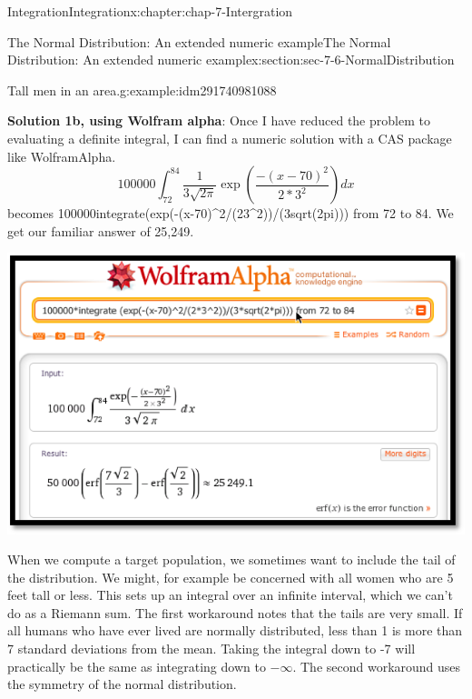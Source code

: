 \documentclass[oneside,10pt,]{book}
\newcommand{\terminology}[1]{\textbf{#1}}
\numberwithin{equation}{section}
\begin{document}
\begin{chapterptx}{Integration}{}{Integration}{}{}{x:chapter:chap-7-Intergration}
\begin{sectionptx}{The Normal Distribution: An extended numeric example}{}{The Normal Distribution: An extended numeric example}{}{}{x:section:sec-7-6-NormalDistribution}
\begin{example}{Tall men in an area.}{g:example:idm291740981088}
\begin{sidebyside}{1}{0.25}{0.25}{0}
\begin{sbspanel}{0.5}
\end{sbspanel}%
\end{sidebyside}%
\par
\terminology{Solution 1b, using Wolfram alpha}:  Once I have reduced the problem to evaluating a definite integral, I can find a numeric solution with a CAS package like Wolfram\textbar{}Alpha.%
%
\begin{equation*}
100000\int_{72}^{84} \frac{1}{3\sqrt{2\pi}} \exp\left(\frac{-(x-70)^2}{2*3^2 }\right)dx
\end{equation*}
becomes%
100000\textasteriskcentered{}integrate(exp(-(x-70)\textasciicircum{}2\slash{}(2\textasteriskcentered{}3\textasciicircum{}2))\slash{}(3\textasteriskcentered{}sqrt(2\textasteriskcentered{}pi))) from 72 to 84.%
We get our familiar answer of 25,249.%
\begin{sidebyside}{1}{0.2}{0.2}{0}%
\begin{sbspanel}{0.6}%
\includegraphics[width=\linewidth]{images/sec7-6-6.png}
\end{sbspanel}%
\end{sidebyside}%
\par
When we compute a target population, we sometimes want to include the tail of the distribution.  We might, for example be concerned with all women who are 5 feet tall or less.  This sets up an integral over an infinite interval, which we can’t do as a Riemann sum.  The first workaround notes that the tails are very small.  If all humans who have ever lived are normally distributed, less than 1 is more than 7 standard deviations from the mean.  Taking the integral down to -7 will practically be the same as integrating down to \(-\infty\).  The second workaround uses the symmetry of the normal distribution.%
%
\begin{equation*}

\end{equation*}
\end{example}
\end{sectionptx}
\end{chapterptx}
\end{document}
